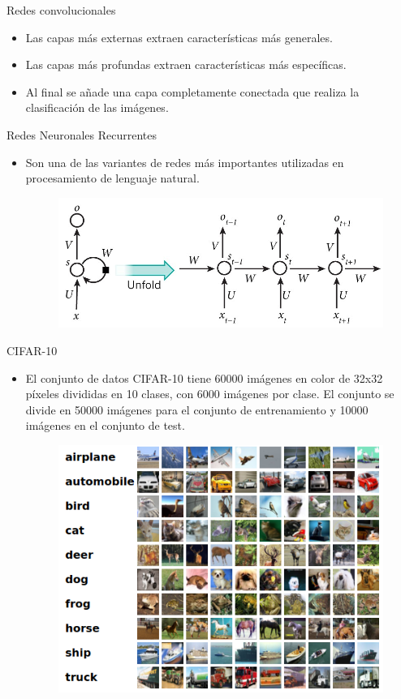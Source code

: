\documentclass[spanish]{beamer}
\begin{document}
\begin{frame}{Redes convolucionales}
    \begin{itemize}
        \item Las capas más externas extraen características más generales.
        \item Las capas más profundas extraen características más específicas.
        \item Al final se añade una capa completamente conectada que realiza la clasificación de las imágenes.
    \end{itemize}
\end{frame}

\begin{frame}{Redes Neuronales Recurrentes}
\begin{itemize}
\item Son una de las variantes de redes más importantes utilizadas en procesamiento
de lenguaje natural.
\begin{figure}[h]
  \centering
  \includegraphics[width=.6\textwidth]{img/rnn}
\end{figure}
\end{itemize}
\end{frame}

\begin{frame}{CIFAR-10}
\begin{itemize}
  \item El conjunto de datos CIFAR-10 tiene 60000 imágenes en color de 32x32 píxeles divididas en 10 clases, con 6000 imágenes por clase. El conjunto se divide en 50000 imágenes para el conjunto de entrenamiento y 10000 imágenes en el conjunto de test.
  \begin{figure}[h]
    \centering
    \includegraphics[width=.6\textwidth]{img/cifar10}
  \end{figure}
\end{itemize}

\end{frame}
\end{document}
